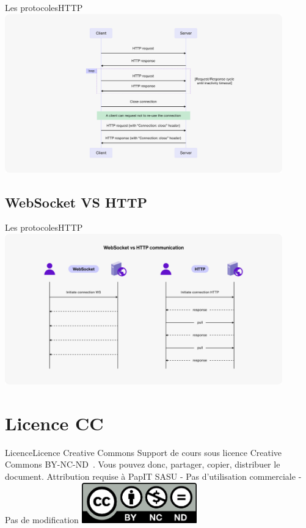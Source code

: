 \documentclass{beamer}
\begin{document}
    \begin{frame}{Les protocoles}{HTTP\label{sendbird-protocole}}
        \centering
        \includegraphics[width=12cm]{image/Tutorial-HTTP-connection-chart}
    \end{frame}

    \subsection{WebSocket VS HTTP}\label{subsec:ws-vs-http}

    \begin{frame}{Les protocoles}{HTTP\label{sendbird-protocole}}
        \centering
        \includegraphics[width=12cm]{image/Tutorial-WebSocket-vs.-HTTP-communication-diagram}
    \end{frame}


    \section{Licence CC}\label{sec:licence}

    \begin{frame}{Licence}{Licence Creative Commons}
        Support de cours sous licence Creative Commons BY-NC-ND~.
        \bigbreak
        Vous pouvez donc, partager, copier, distribuer le document.
        \bigbreak
        Attribution requise à PapIT SASU - Pas d’utilisation commerciale - Pas de modification
        \bigbreak
        \centering
        \includegraphics[width=5cm]{image/by-nc-nd-logo}
    \end{frame}
\end{document}
